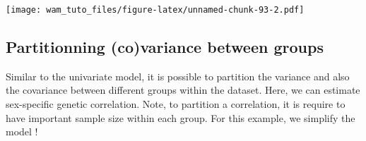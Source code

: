 \documentclass[
  12pt,
]{book}
\newenvironment{Shaded}{\begin{snugshade}}{\end{snugshade}}
\newcommand{\DataTypeTok}[1]{\textcolor[rgb]{0.13,0.29,0.53}{#1}}
\newcommand{\DecValTok}[1]{\textcolor[rgb]{0.00,0.00,0.81}{#1}}
\newcommand{\FloatTok}[1]{\textcolor[rgb]{0.00,0.00,0.81}{#1}}
\newcommand{\KeywordTok}[1]{\textcolor[rgb]{0.13,0.29,0.53}{\textbf{#1}}}
\newcommand{\NormalTok}[1]{#1}
\newcommand{\OperatorTok}[1]{\textcolor[rgb]{0.81,0.36,0.00}{\textbf{#1}}}
\newcommand{\StringTok}[1]{\textcolor[rgb]{0.31,0.60,0.02}{#1}}
\begin{document}
\texttt{[image: wam\_tuto\_files/figure-latex/unnamed-chunk-93-2.pdf]}

\hypertarget{partitionning-covariance-between-groups}{%
\subsection{Partitionning (co)variance between groups}\label{partitionning-covariance-between-groups}}

Similar to the univariate model, it is possible to partition the variance and also the covariance between different groups within the dataset. Here, we can estimate sex-specific genetic correlation.
Note, to partition a correlation, it is require to have important sample size within each group. For this example, we simplify the model !

\begin{Shaded}
\end{Shaded}
\end{document}

